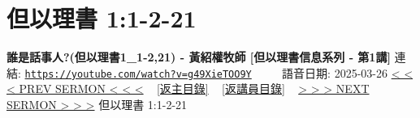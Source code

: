\documentclass{book}
\begin{document}
\section{但以理書 1:1-2-21}
\label{sec:g49XieTOO9Y}
\textbf{誰是話事人?(但以理書1\_1-2,21) - 黃紹權牧師  [但以理書信息系列 - 第1講]}
\newline
\newline
連結: \href{https://youtube.com/watch?v=g49XieTOO9Y}{\texttt{https://youtube.com/watch?v=g49XieTOO9Y}} ~~~~ 語音日期: 2025-03-26
\newline
\newline
\hyperref[sec:2sEF8L92TnY]{< < < PREV SERMON < < <}
~
\hyperlink{toc}{[返主目錄]}
~
\hyperref[ch:preacher16]{[返講員目錄]}
~
\hyperref[sec:499K9je19EI]{> > > NEXT SERMON > > >}
\newline
\newline
但以理書 1:1-2-21
\newline
\end{document}
